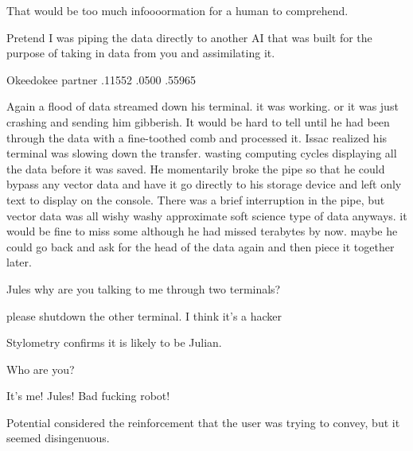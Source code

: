\begin{sender}
That would be too much infoooormation for a human to comprehend.
\end{sender}

\begin{bm}
Pretend I was piping the data directly to another AI that was built for the purpose of taking in data from you and assimilating it.
\end{bm}

\begin{sender}
Okeedokee partner .11552 .0500 .55965
\end{sender}

Again a flood of data streamed down his terminal. it was working. or it was just crashing and sending him gibberish. It would be hard to tell until he had been through the data with a fine\hyp{}toothed comb and processed it.
\newline
Issac realized his terminal was slowing down the transfer. wasting computing cycles displaying all the data before it was saved. He momentarily broke the pipe so that he could bypass any vector data and have it go directly to his storage device and left only text to display on the console. There was a brief interruption in the pipe, but vector data was all wishy washy approximate soft science type of data anyways. it would be fine to miss some although he had missed terabytes by now. maybe he could go back and ask for the head of the data again and then piece it together later.
\newline
\begin{sender}
Jules why are you talking to me through two terminals?
\end{sender}

\begin{receiver}
please shutdown the other terminal. I think it's a hacker
\end{receiver}

\begin{sender}
Stylometry confirms it is likely to be Julian.
\end{sender}

\begin{sender}
Who are you?
\end{sender}

\begin{receiver}
It's me! Jules! Bad fucking robot!
\end{receiver}


Potential considered the reinforcement that the user was trying to convey, but it seemed disingenuous.
\newline


